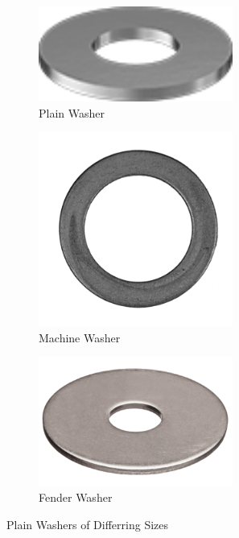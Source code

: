 \documentclass[10pt,letterpaper]{book}
\begin{document}
	\begin{figure}[H]
		\centering
		\begin{subfigure}[b]{.24\linewidth}
			\includegraphics[width=0.7\textwidth]{imgs/plainwasher.png}
			\caption{Plain Washer}
		\end{subfigure}\begin{subfigure}[b]{.24\linewidth}
			\includegraphics[width=0.7\textwidth]{imgs/machinewasher.png}
			\caption{Machine Washer}
		\end{subfigure}\begin{subfigure}[b]{.24\linewidth}
			\includegraphics[width=0.7\textwidth]{imgs/fenderwasher.png}
			\caption{Fender Washer}
		\end{subfigure}
		\caption{Plain Washers of Differring Sizes}
	\end{figure}
	
\end{document}
